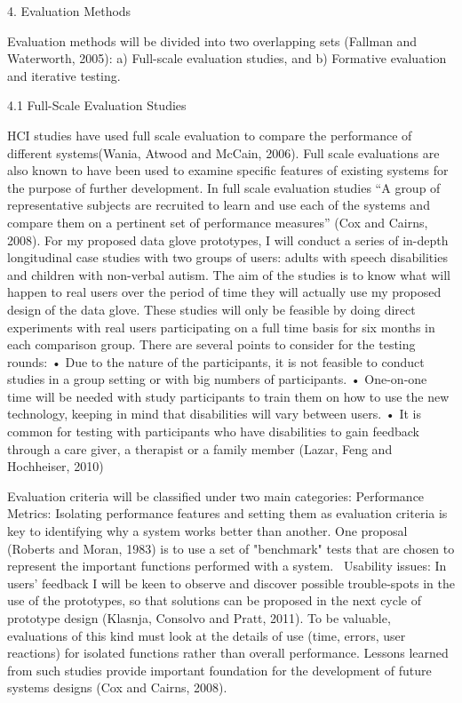 4. Evaluation Methods 

Evaluation methods will be divided into two overlapping sets (Fallman and Waterworth, 2005): 
a) Full-scale evaluation studies, and b) Formative evaluation and iterative testing.   

4.1 Full-Scale Evaluation Studies 

HCI studies have used full scale evaluation to compare the performance of different systems(Wania, Atwood and McCain, 2006).  Full scale evaluations are also known to have been used to examine specific features of existing systems for the purpose of further development.  In full scale evaluation studies “A group of representative subjects are recruited to learn and use each of the systems and compare them on a pertinent set of performance measures” (Cox and Cairns, 2008).
For my proposed data glove prototypes, I will conduct a series of in-depth longitudinal case studies with two groups of users: adults with speech disabilities and children with non-verbal autism. The aim of the studies is to know what will happen to real users over the period of time they will actually use my proposed design of the data glove. These studies will only be feasible by doing direct experiments with real users participating on a full time basis for six months in each comparison group. There are several points to consider for the testing rounds:
•	Due to the nature of the participants, it is not feasible to conduct studies in a group setting or with big numbers of participants. 
•	One-on-one time will be needed with study participants to train them on how to use the new technology, keeping in mind that disabilities will vary between users. 
•	It is common for testing with participants who have disabilities to gain feedback through a care giver, a therapist or a family member (Lazar, Feng and Hochheiser, 2010) 

Evaluation criteria will be classified under two main categories:
Performance Metrics: Isolating performance features and setting them as evaluation criteria is key to identifying why a system works better than another.  One proposal (Roberts and Moran, 1983) is to use a set of "benchmark" tests that are chosen to represent the important functions performed with a system. 
Usability issues: In users’ feedback I will be keen to observe and discover possible trouble-spots in the use of the prototypes, so that solutions can be proposed in the next cycle of prototype design (Klasnja, Consolvo and Pratt, 2011). To be valuable, evaluations of this kind must look at the details of use (time, errors, user reactions) for isolated functions rather than overall performance. Lessons learned from such studies provide important foundation for the development of future systems designs (Cox and Cairns, 2008).

